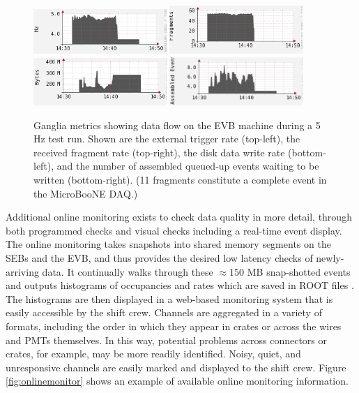 \begin{figure}
\centering
\includegraphics[width=0.45\textwidth]{./figures/ganglia_EXT_trigRate.png}
\includegraphics[width=0.45\textwidth]{./figures/ganglia_RECEIVEDfrag_rate.png}\\
\includegraphics[width=0.45\textwidth]{./figures/ganglia_WRITEdata_rate.png}
\includegraphics[width=0.45\textwidth]{./figures/ganglia_WRITEQUE_size.png}
\caption{Ganglia metrics showing data flow on the EVB machine during a 5 Hz test run. Shown are the external trigger rate (top-left), the received fragment rate (top-right), the disk data write rate (bottom-left), and the number of assembled queued-up events waiting to be written (bottom-right). (11 fragments constitute a complete event in the MicroBooNE DAQ.)}
\label{fig:ganglia}
\end{figure}

Additional online monitoring exists to check data quality in more detail, through both programmed checks and visual checks including a real-time event display. The online monitoring takes snapshots into shared memory segments on the SEBs and the EVB, and thus provides the desired low latency checks of newly-arriving data. It continually walks through these $\approx 150$ MB snap-shotted events and outputs histograms of occupancies and rates which are saved in ROOT files \cite{BRUN199781}. The histograms are then displayed in a web-based monitoring system that is easily accessible by the shift crew. Channels are aggregated in a variety of formats, including the order in which they appear in crates or across the wires and PMTs themselves. In this way, potential problems across connectors or crates, for example, may be more readily identified. Noisy, quiet, and unresponsive channels are easily marked and displayed to the shift crew.  Figure \ref{fig:onlinemonitor} shows an example of available online monitoring information.

